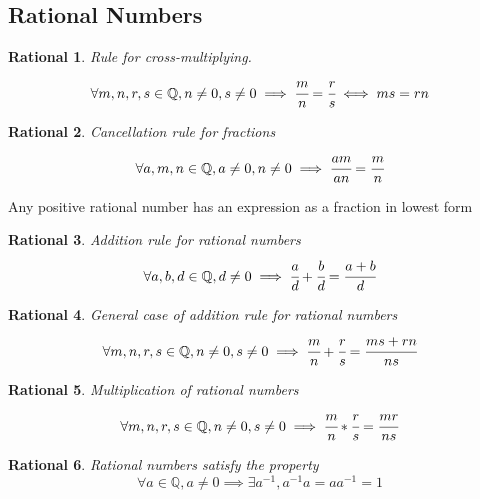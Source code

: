 \subsection{Rational Numbers}
\newtheorem{rational}{Rational}[section]
\begin{rational}
Rule for cross-multiplying.
\[
\forall m, n, r, s \in \mathbb{Q}, n \neq 0, s \neq 0 \implies \cfrac{m}{n} = \cfrac{r}{s} \iff ms = rn
\]
\end{rational}
\begin{rational}
Cancellation rule for fractions
\[
\forall a, m, n \in \mathbb{Q}, a \neq 0, n \neq 0 \implies \cfrac{am}{an} = \cfrac{m}{n}
\]
\end{rational}
\begin{theorem}
Any positive rational number has an expression as a fraction in lowest form
\end{theorem}
\begin{rational}
Addition rule for rational numbers
\[
\forall a, b, d \in \mathbb{Q}, d \neq 0 \implies \cfrac{a}{d} + \cfrac{b}{d} = \cfrac{a + b}{d}
\]
\end{rational}
\begin{rational}
General case of addition rule for rational numbers
\[
\forall m, n, r, s \in \mathbb{Q}, n \neq 0, s \neq 0 \implies \cfrac{m}{n} + \cfrac{r}{s} = \cfrac{ms + rn}{ns}
\]
\end{rational}
\begin{rational}
Multiplication of rational numbers
\[
\forall m, n, r, s \in \mathbb{Q}, n \neq 0, s \neq 0 \implies \cfrac{m}{n}*\cfrac{r}{s} = \cfrac{mr}{ns}
\]
\end{rational}
\begin{rational}
Rational numbers satisfy the property
\[
\forall a \in \mathbb{Q}, a \neq 0 \implies \exists a^{-1}, a^{-1}a = aa^{-1} = 1
\]
\end{rational}
